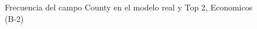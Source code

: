 \begin{figure}[H]
    \centering
    
    \caption{Frecuencia del campo County en el modelo real y Top 2, Economicos (B-2)}
    \label{frecuency-County-top2}
\end{figure}